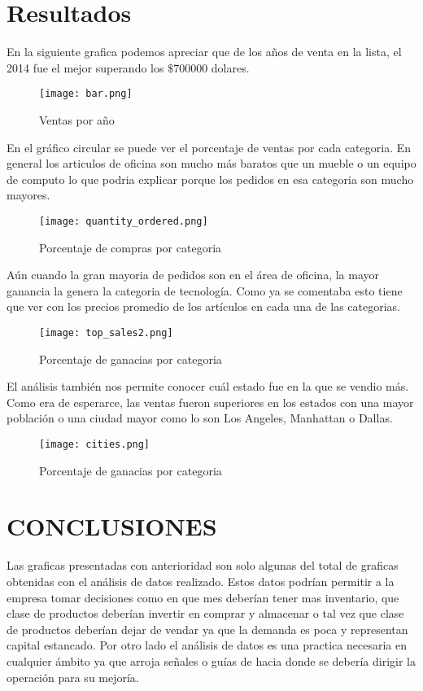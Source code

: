 \documentclass[%
 reprint,
 amsmath,amssymb,
 aps,
]{revtex4-2}
\begin{document}
\section{Resultados}
En la siguiente grafica podemos apreciar que de los años de venta en la lista, el 2014 fue el mejor superando los $ \$700000$ dolares.
\begin{figure}[H]
    \centering
    \texttt{[image: bar.png]}
    \caption{Ventas por año}
    \label{fig:my_label}
\end{figure}
En el gráfico circular se puede ver el porcentaje de ventas por cada categoria. En general los articulos de oficina son mucho más baratos que un mueble o un equipo de computo lo que podria explicar porque los pedidos en esa categoria son mucho mayores.
\begin{figure}[H]
    \centering
    \texttt{[image: quantity\_ordered.png]}
    \caption{Porcentaje de compras por categoria}
    \label{fig:my_label}
\end{figure}
Aún cuando la gran mayoria de pedidos son en el área de oficina, la mayor ganancia la genera la categoria de tecnología. Como ya se comentaba esto tiene que ver con los precios promedio de los artículos en cada una de las categorias.

\begin{figure}[H]
    \centering
    \texttt{[image: top\_sales2.png]}
    \caption{Porcentaje de ganacias por categoria}
    \label{fig:my_label}
\end{figure}
El análisis también nos permite conocer cuál estado fue en la que se vendio más. Como era de esperarce, las ventas fueron superiores en los estados con una mayor población o una ciudad mayor como lo son Los Angeles, Manhattan o Dallas.
\begin{figure}[H]
    \centering
    \texttt{[image: cities.png]}
    \caption{Porcentaje de ganacias por categoria}
    \label{fig:my_label}
\end{figure}

\section{CONCLUSIONES}
Las graficas presentadas con anterioridad son solo algunas del total de graficas obtenidas con el análisis de datos realizado. Estos datos podrían permitir a la empresa tomar decisiones como en que mes deberían tener mas inventario, que clase de productos deberían invertir en comprar y almacenar o tal vez que clase de productos deberían dejar de vendar ya que la demanda es poca y representan capital estancado.
Por otro lado el análisis de datos es una practica necesaria en cualquier ámbito ya que arroja señales o guías de hacia donde se debería dirigir la operación para su mejoría.
\end{document}
